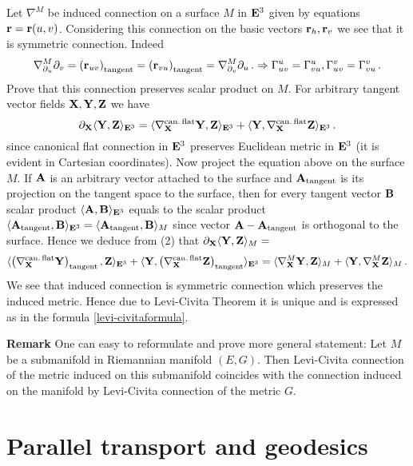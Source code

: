 \documentclass[12pt]{article}
\theoremstyle{theorem}
\numberwithin{equation}{section}
\begin{document}
{Let $\nabla^{M}$ be induced connection on a surface $M$  in ${\bf E}^3$ given by equations
${\bf r}={\bf r}(u,v)$. Considering this connection on
the basic vectors ${\bf r}_h,{\bf r}_v$ we see that it is symmetric connection. Indeed
          $$
      \nabla^{M}_{\partial_u}\partial_v=\left({\bf r}_{uv}\right)_{\rm tangent}=\left({\bf r}_{vu}\right)_{\rm tangent}=
          \nabla^{M}_{\partial_v}\partial_u\,. \Rightarrow \Gamma^{u}_{uv}=\Gamma^{u}_{vu},
          \Gamma^{v}_{uv}=\Gamma^{v}_{vu}\,.
          $$
Prove that this connection preserves scalar product on $M$.
For arbitrary tangent vector fields  ${\bf X},{\bf Y},{\bf Z}$ we have
         $$
         \partial_{\bf X}\langle {\bf Y},{\bf Z}\rangle_{{\bf E}^3}=\langle \nabla_{\bf X} ^{\rm can.\,flat}{\bf Y},{\bf Z}\rangle_{{\bf E}^3}+
    \langle {\bf Y},\nabla_{\bf X} ^{\rm can.\,flat}{\bf Z}\rangle_{{\bf E}^3}\,.
         $$
since canonical flat connection in ${\bf E}^3$
preserves Euclidean metric in ${\bf E}^3$ (it is evident in Cartesian coordinates).
Now project the equation above on the surface $M$.
If ${\bf A}$ is an arbitrary vector attached to the surface and ${\bf A}_{\rm tangent}$ is its
 projection on the tangent space to the surface, then
 for every tangent vector $\bf B$ scalar product $\langle{\bf A},{\bf B}\rangle_{{\bf E}^3}$ equals to
 the scalar product $\langle{\bf A}_{\rm tangent},{\bf B}\rangle_{{\bf E}^3}=
 \langle{\bf A}_{\rm tangent},{\bf B}\rangle_{M}$
  since vector ${\bf A}-{\bf A}_{\rm tangent}$
 is orthogonal to the surface.  Hence we deduce from  (2) that  $ \partial_{\bf X}\langle {\bf Y},{\bf Z}\rangle_{M}=$
                    $$
   \langle \left(\nabla_{\bf X} ^{\rm can.\,flat}{\bf Y}\right)_{\rm tangent},{\bf Z}\rangle_{{\bf E}^3}+
    \langle {\bf Y},\left(\nabla_{\bf X} ^{\rm can.\,flat}{\bf Z}\right)_{\rm tangent}\rangle_{{\bf E}^3}=
                    \langle \nabla_{\bf X} ^{M}{\bf Y},{\bf Z}\rangle_{M}+
    \langle {\bf Y},\nabla_{\bf X} ^{M}{\bf Z}\rangle_{M}\,.
                    $$
 We see that induced connection is symmetric connection which preserves the induced metric.
 Hence due to Levi-Civita Theorem it is unique and is expressed as in the formula \eqref{levi-civitaformula}.

\m




{\bf Remark} {\footnotesize One can easy to reformulate and prove more general statement:
Let $M$ be a submanifold in Riemannian manifold $(E,G)$. Then Levi-Civita connection
of the metric induced on this submanifold coincides with the connection induced on the manifold
by Levi-Civita connection of the metric $G$.}


   \section {Parallel transport and geodesics}

}
\end{document}
